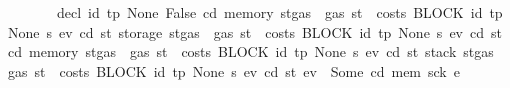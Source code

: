 \begin{isabellebody}
\ \ \ \ \ \ \ {\isachardoublequoteopen}decl\ id{}\ tp\ None\ False\ cd\ {\isacharparenleft}{\kern0pt}memory\ {\isacharparenleft}{\kern0pt}st{\isasymlparr}gas\ {\isacharcolon}{\kern0pt}{\isacharequal}{\kern0pt}\ gas\ st\ {\isacharminus}{\kern0pt}\ costs\ {\isacharparenleft}{\kern0pt}BLOCK\ {\isacharparenleft}{\kern0pt}{\isacharparenleft}{\kern0pt}id{}{\isacharcomma}{\kern0pt}\ tp{\isacharparenright}{\kern0pt}{\isacharcomma}{\kern0pt}\ None{\isacharparenright}{\kern0pt}\ s{\isacharparenright}{\kern0pt}\ ev\ cd\ st{\isasymrparr}{\isacharparenright}{\kern0pt}{\isacharparenright}{\kern0pt}\ {\isacharparenleft}{\kern0pt}storage\ {\isacharparenleft}{\kern0pt}st{\isasymlparr}gas\ {\isacharcolon}{\kern0pt}{\isacharequal}{\kern0pt}\ gas\ st\ {\isacharminus}{\kern0pt}\ costs\ {\isacharparenleft}{\kern0pt}BLOCK\ {\isacharparenleft}{\kern0pt}{\isacharparenleft}{\kern0pt}id{}{\isacharcomma}{\kern0pt}\ tp{\isacharparenright}{\kern0pt}{\isacharcomma}{\kern0pt}\ None{\isacharparenright}{\kern0pt}\ s{\isacharparenright}{\kern0pt}\ ev\ cd\ st{\isasymrparr}{\isacharparenright}{\kern0pt}{\isacharparenright}{\kern0pt}\ {\isacharparenleft}{\kern0pt}cd{\isacharcomma}{\kern0pt}\ memory\ {\isacharparenleft}{\kern0pt}st{\isasymlparr}gas\ {\isacharcolon}{\kern0pt}{\isacharequal}{\kern0pt}\ gas\ st\ {\isacharminus}{\kern0pt}\ costs\ {\isacharparenleft}{\kern0pt}BLOCK\ {\isacharparenleft}{\kern0pt}{\isacharparenleft}{\kern0pt}id{}{\isacharcomma}{\kern0pt}\ tp{\isacharparenright}{\kern0pt}{\isacharcomma}{\kern0pt}\ None{\isacharparenright}{\kern0pt}\ s{\isacharparenright}{\kern0pt}\ ev\ cd\ st{\isasymrparr}{\isacharparenright}{\kern0pt}{\isacharcomma}{\kern0pt}\ stack\ {\isacharparenleft}{\kern0pt}st{\isasymlparr}gas\ {\isacharcolon}{\kern0pt}{\isacharequal}{\kern0pt}\ gas\ st\ {\isacharminus}{\kern0pt}\ costs\ {\isacharparenleft}{\kern0pt}BLOCK\ {\isacharparenleft}{\kern0pt}{\isacharparenleft}{\kern0pt}id{}{\isacharcomma}{\kern0pt}\ tp{\isacharparenright}{\kern0pt}{\isacharcomma}{\kern0pt}\ None{\isacharparenright}{\kern0pt}\ s{\isacharparenright}{\kern0pt}\ ev\ cd\ st{\isasymrparr}{\isacharparenright}{\kern0pt}{\isacharcomma}{\kern0pt}\ ev{\isacharparenright}{\kern0pt}\ {\isacharequal}{\kern0pt}\ Some\ {\isacharparenleft}{\kern0pt}cd{\isacharprime}{\kern0pt}{\isacharcomma}{\kern0pt}\ mem{\isacharprime}{\kern0pt}{\isacharcomma}{\kern0pt}\ sck{\isacharprime}{\kern0pt}{\isacharcomma}{\kern0pt}\ e{\isacharprime}{\kern0pt}{\isacharparenright}{\kern0pt}{\isachardoublequoteclose}\isanewline

\end{isabellebody}
